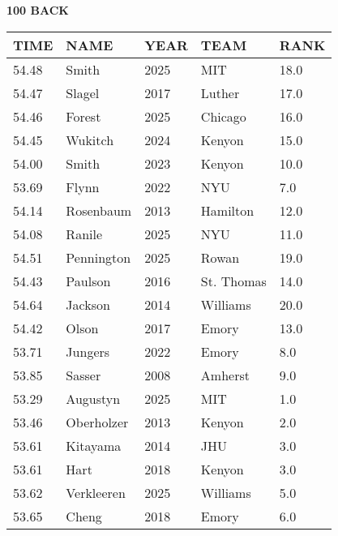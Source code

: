 \begin{minipage}[t]{0.48\textwidth}
\centering
\textbf{100 BACK}\\[0.05cm]
\begin{tabular}{@{}p{1.8cm}p{2.8cm}p{1.2cm}p{1.4cm}p{0.8cm}@{}}
\hline
\textbf{TIME} & \textbf{NAME} & \textbf{YEAR} & \textbf{TEAM} & \textbf{RANK} \\
\hline
54.48 & Smith & 2025 & MIT & 18.0 \\
54.47 & Slagel & 2017 & Luther & 17.0 \\
54.46 & Forest & 2025 & Chicago & 16.0 \\
54.45 & Wukitch & 2024 & Kenyon & 15.0 \\
54.00 & Smith & 2023 & Kenyon & 10.0 \\
53.69 & Flynn & 2022 & NYU & 7.0 \\
54.14 & Rosenbaum & 2013 & Hamilton & 12.0 \\
54.08 & Ranile & 2025 & NYU & 11.0 \\
54.51 & Pennington & 2025 & Rowan & 19.0 \\
54.43 & Paulson & 2016 & St. Thomas & 14.0 \\
54.64 & Jackson & 2014 & Williams & 20.0 \\
54.42 & Olson & 2017 & Emory & 13.0 \\
53.71 & Jungers & 2022 & Emory & 8.0 \\
53.85 & Sasser & 2008 & Amherst & 9.0 \\
53.29 & Augustyn & 2025 & MIT & 1.0 \\
53.46 & Oberholzer & 2013 & Kenyon & 2.0 \\
53.61 & Kitayama & 2014 & JHU & 3.0 \\
53.61 & Hart & 2018 & Kenyon & 3.0 \\
53.62 & Verkleeren & 2025 & Williams & 5.0 \\
53.65 & Cheng & 2018 & Emory & 6.0 \\
\hline
\end{tabular}
\end{minipage}

\vspace{0.4cm}

